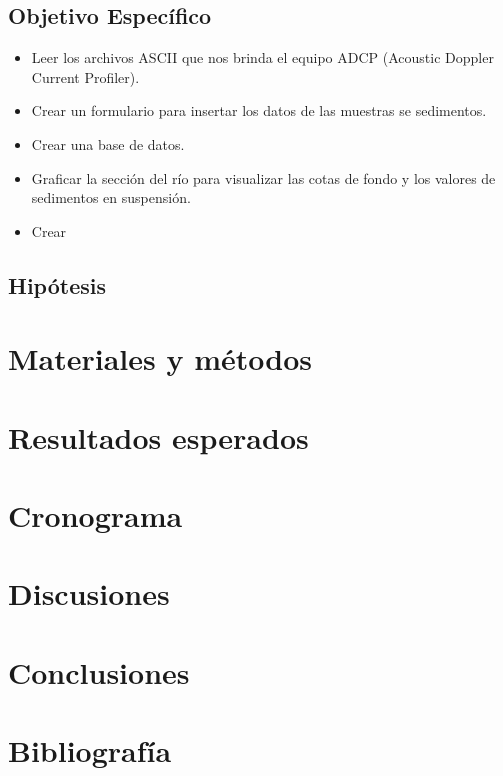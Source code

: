 \documentclass[12pt,a4paper]{report}
\begin{document}
	\subsection{Objetivo Espec\'ifico}
	\begin{itemize}
	\item Leer los archivos ASCII que nos brinda el equipo ADCP (Acoustic Doppler Current Profiler).
	\item Crear un formulario para insertar los datos de las muestras se sedimentos.
	\item Crear una base de datos.
	\item Graficar la sección del r\'io para visualizar las cotas de fondo y los valores de sedimentos en suspensi\'on.
	\item Crear
	\end{itemize}

	\subsection{Hip\'otesis}

\section{Materiales y m\'etodos}
\section{Resultados esperados}
\section{Cronograma}
\section{Discusiones}
\section{Conclusiones}
\section{Bibliograf\'ia}
\end{document}
